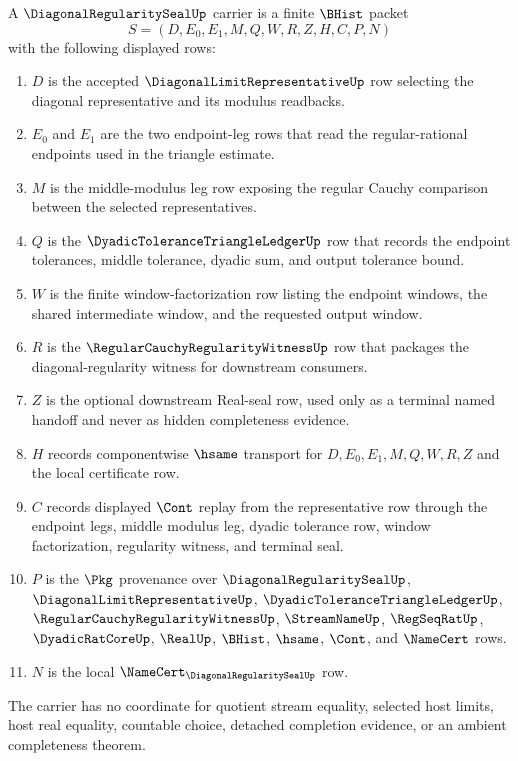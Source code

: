 \begin{definition}
\label{def:diagonal-regularity-seal-carrier}
A $\DiagonalRegularitySealUp$ carrier is a finite $\BHist$ packet
$$
S=(D,E_0,E_1,M,Q,W,R,Z,H,C,P,N)
$$
with the following displayed rows:
\begin{enumerate}
\item $D$ is the accepted $\DiagonalLimitRepresentativeUp$ row selecting the diagonal representative and its modulus readbacks.
\item $E_0$ and $E_1$ are the two endpoint-leg rows that read the regular-rational endpoints used in the triangle estimate.
\item $M$ is the middle-modulus leg row exposing the regular Cauchy comparison between the selected representatives.
\item $Q$ is the $\DyadicToleranceTriangleLedgerUp$ row that records the endpoint tolerances, middle tolerance, dyadic sum, and output tolerance bound.
\item $W$ is the finite window-factorization row listing the endpoint windows, the shared intermediate window, and the requested output window.
\item $R$ is the $\RegularCauchyRegularityWitnessUp$ row that packages the diagonal-regularity witness for downstream consumers.
\item $Z$ is the optional downstream Real-seal row, used only as a terminal named handoff and never as hidden completeness evidence.
\item $H$ records componentwise $\hsame$ transport for $D,E_0,E_1,M,Q,W,R,Z$ and the local certificate row.
\item $C$ records displayed $\Cont$ replay from the representative row through the endpoint legs, middle modulus leg, dyadic tolerance row, window factorization, regularity witness, and terminal seal.
\item $P$ is the $\Pkg$ provenance over $\DiagonalRegularitySealUp$, $\DiagonalLimitRepresentativeUp$, $\DyadicToleranceTriangleLedgerUp$, $\RegularCauchyRegularityWitnessUp$, $\StreamNameUp$, $\RegSeqRatUp$, $\DyadicRatCoreUp$, $\RealUp$, $\BHist$, $\hsame$, $\Cont$, and $\NameCert$ rows.
\item $N$ is the local $\NameCert_{\DiagonalRegularitySealUp}$ row.
\end{enumerate}
The carrier has no coordinate for quotient stream equality, selected host limits, host real equality, countable choice, detached completion evidence, or an ambient completeness theorem.
\end{definition}

